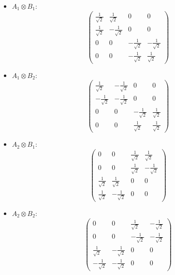 \documentclass{article}
\begin{document}
\begin{itemize}
    \item \( A_1 \otimes B_1 \):
    \[
    \begin{pmatrix}
    \frac{1}{\sqrt{2}} & \frac{1}{\sqrt{2}} & 0 & 0 \\
    \frac{1}{\sqrt{2}} & -\frac{1}{\sqrt{2}} & 0 & 0 \\
    0 & 0 & -\frac{1}{\sqrt{2}} & -\frac{1}{\sqrt{2}} \\
    0 & 0 & -\frac{1}{\sqrt{2}} & \frac{1}{\sqrt{2}}
    \end{pmatrix}
    \]
    \item \( A_1 \otimes B_2 \):
    \[
    \begin{pmatrix}
    \frac{1}{\sqrt{2}} & -\frac{1}{\sqrt{2}} & 0 & 0 \\
    -\frac{1}{\sqrt{2}} & -\frac{1}{\sqrt{2}} & 0 & 0 \\
    0 & 0 & -\frac{1}{\sqrt{2}} & \frac{1}{\sqrt{2}} \\
    0 & 0 & \frac{1}{\sqrt{2}} & \frac{1}{\sqrt{2}}
    \end{pmatrix}
    \]
    \item \( A_2 \otimes B_1 \):
    \[
    \begin{pmatrix}
    0 & 0 & \frac{1}{\sqrt{2}} & \frac{1}{\sqrt{2}} \\
    0 & 0 & \frac{1}{\sqrt{2}} & -\frac{1}{\sqrt{2}} \\
    \frac{1}{\sqrt{2}} & \frac{1}{\sqrt{2}} & 0 & 0 \\
    \frac{1}{\sqrt{2}} & -\frac{1}{\sqrt{2}} & 0 & 0
    \end{pmatrix}
    \]
    \item \( A_2 \otimes B_2 \):
    \[
    \begin{pmatrix}
    0 & 0 & \frac{1}{\sqrt{2}} & -\frac{1}{\sqrt{2}} \\
    0 & 0 & -\frac{1}{\sqrt{2}} & -\frac{1}{\sqrt{2}} \\
    \frac{1}{\sqrt{2}} & -\frac{1}{\sqrt{2}} & 0 & 0 \\
    -\frac{1}{\sqrt{2}} & -\frac{1}{\sqrt{2}} & 0 & 0
    \end{pmatrix}
    \]
\end{itemize}
\end{document}
